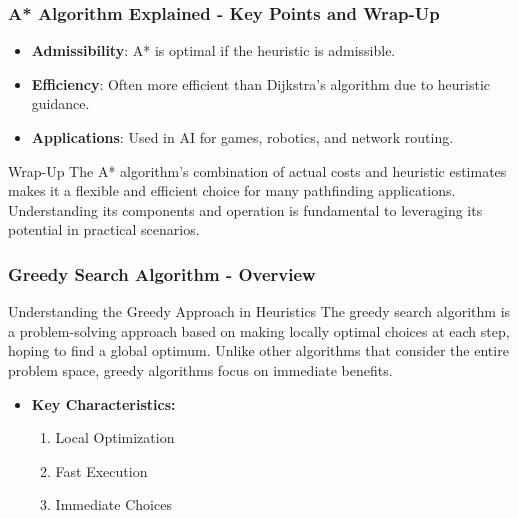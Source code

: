 \documentclass[aspectratio=169]{beamer}
\begin{document}
\begin{frame}[fragile]
    \frametitle{A* Algorithm Explained - Key Points and Wrap-Up}
    \begin{itemize}
        \item \textbf{Admissibility}: A* is optimal if the heuristic is admissible.
        \item \textbf{Efficiency}: Often more efficient than Dijkstra’s algorithm due to heuristic guidance.
        \item \textbf{Applications}: Used in AI for games, robotics, and network routing.
    \end{itemize}
    \begin{block}{Wrap-Up}
        The A* algorithm's combination of actual costs and heuristic estimates makes it a flexible and efficient choice for many pathfinding applications. Understanding its components and operation is fundamental to leveraging its potential in practical scenarios.
    \end{block}
\end{frame}

\begin{frame}[fragile]
    \frametitle{Greedy Search Algorithm - Overview}
    \begin{block}{Understanding the Greedy Approach in Heuristics}
        The greedy search algorithm is a problem-solving approach based on making locally optimal choices at each step, hoping to find a global optimum. Unlike other algorithms that consider the entire problem space, greedy algorithms focus on immediate benefits.
    \end{block}
    
    \begin{itemize}
        \item \textbf{Key Characteristics:}
            \begin{enumerate}
                \item Local Optimization
                \item Fast Execution
                \item Immediate Choices
            \end{enumerate}
    \end{itemize}
\end{frame}
\end{document}
